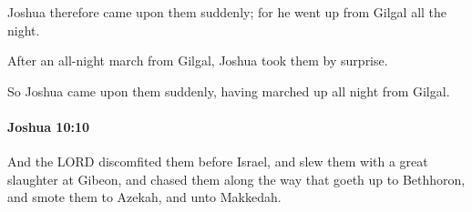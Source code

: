 			\begin{versebox}
					\item[BHS] 
					\item[ASV] Joshua therefore came upon them suddenly; for he went up from Gilgal all the night.
					\item[NIV] After an all-night march from Gilgal, Joshua took them by surprise.
					\item[NRSV] So Joshua came upon them suddenly, having marched up all night from Gilgal.
			\end{versebox}

		\paragraph{Joshua 10:10} %
			\label{JOSHUA-10-10}

			And the LORD discomfited them before Israel, and slew them with a great slaughter at Gibeon, and chased them along the way that goeth up to Bethhoron, and smote them to Azekah, and unto Makkedah.

